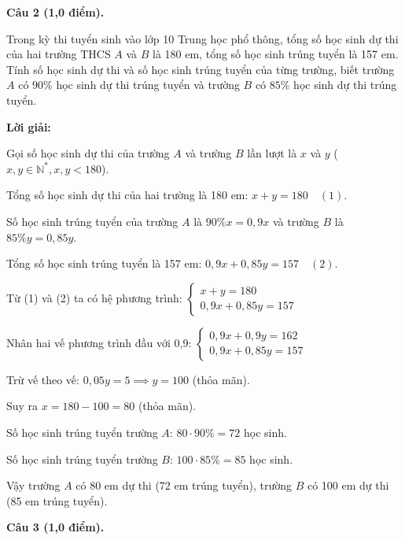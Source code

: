 \documentclass[12pt,a4paper]{article}
\begin{document}
\vspace{3mm}
\noindent\textbf{Câu 2 (1,0 điểm).}

Trong kỳ thi tuyển sinh vào lớp 10 Trung học phổ thông, tổng số học sinh dự thi của hai trường THCS $A$ và $B$ là 180 em, tổng số học sinh trúng tuyển là 157 em. Tính số học sinh dự thi và số học sinh trúng tuyển của từng trường, biết trường $A$ có $90\%$ học sinh dự thi trúng tuyển và trường $B$ có $85\%$ học sinh dự thi trúng tuyển.

\noindent\textbf{Lời giải:}

Gọi số học sinh dự thi của trường $A$ và trường $B$ lần lượt là $x$ và $y$ ($x, y \in \mathbb{N}^*, x, y < 180$).\par Tổng số học sinh dự thi của hai trường là 180 em: $x + y = 180 \quad (1)$.\par Số học sinh trúng tuyển của trường $A$ là $90\% x = 0{,}9x$ và trường $B$ là $85\% y = 0{,}85y$.\par Tổng số học sinh trúng tuyển là 157 em: $0{,}9x + 0{,}85y = 157 \quad (2)$.\par Từ (1) và (2) ta có hệ phương trình: $\begin{cases} x + y = 180 \\ 0{,}9x + 0{,}85y = 157 \end{cases}$\par Nhân hai vế phương trình đầu với 0,9: $\begin{cases} 0{,}9x + 0{,}9y = 162 \\ 0{,}9x + 0{,}85y = 157 \end{cases}$\par Trừ vế theo vế: $0{,}05y = 5 \implies y = 100$ (thỏa mãn).\par Suy ra $x = 180 - 100 = 80$ (thỏa mãn).\par Số học sinh trúng tuyển trường $A$: $80 \cdot 90\% = 72$ học sinh.\par Số học sinh trúng tuyển trường $B$: $100 \cdot 85\% = 85$ học sinh.\par Vậy trường $A$ có 80 em dự thi (72 em trúng tuyển), trường $B$ có 100 em dự thi (85 em trúng tuyển).

\vspace{3mm}
\newpage
\noindent\textbf{Câu 3 (1,0 điểm).}
\end{document}
